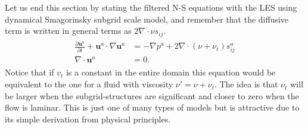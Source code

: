 Let us end this section by stating the filtered N-S equations with the LES using 
dynamical Smagorinsky subgrid scale model, and remember that the diffusive term is written 
in general terms as $2\nabla \cdot \nu s_{ij}$.  
%
\begin{align}
    \begin{split}
        \frac{\partial \mathbf{u}^a}{\partial t} + \mathbf{u}^a\cdot \nabla\mathbf{u}^a
        &= -\nabla p^a +2\nabla \cdot (\nu + \nu_t) s^a_{ij} \\
        \nabla \cdot \mathbf{u}^a &= 0.
    \end{split}
	\label{eq:NSLES}
\end{align}
%
Notice that if $v_t$ is a constant in the entire domain this equation would 
be equivalent to the one for a fluid with viscosity $\nu'= \nu + \nu_t$. The idea is 
that $\nu_t$ will be larger when the subgrid-structures are significant and closer to zero 
when the flow is laminar. This is just one of many types of models but is attractive due to its
simple derivation from physical principles.



